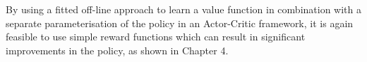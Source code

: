 \begin{itemize}
 By using a fitted off-line approach to learn a value function in combination with 
 a separate parameterisation of the policy in an Actor-Critic framework, it is
 again feasible to use simple reward functions which can result in significant 
 improvements in the policy, as shown in Chapter 4.
 
 
 
 
\end{itemize}





